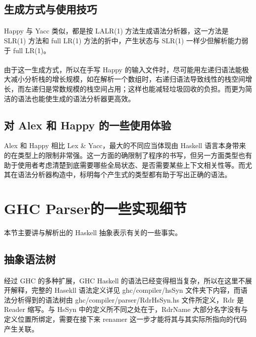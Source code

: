 \documentclass{article}
\begin{document}
 	\subsection{生成方式与使用技巧}
 	\paragraph{}
 	Happy 与 Yacc 类似，都是按 LALR(1) 方法生成语法分析器，这一方法是 SLR(1) 方法和 full LR(1) 方法的折中，产生状态与 SLR(1) 一样少但解析能力弱于 full LR(1)。
 	\paragraph{}
 	由于这一生成方式，所以在手写 Happy 的输入文件时，尽可能用左递归语法能极大减小分析栈的增长规模，如在解析一个数组时，右递归语法导致线性的栈空间增长，而左递归是常数规模的栈空间占用；这样也能减轻垃圾回收的负担。而更为简洁的语法也能使生成的语法分析器更高效。
 	\subsection{对 Alex 和 Happy 的一些使用体验}
 	Alex 和 Happy 相比 Lex \& Yacc，最大的不同应当体现由 Haskell 语言本身带来的在类型上的限制非常强。这一方面的确限制了程序的书写，但另一方面类型也有助于使用者考虑清楚到底需要哪些全局状态、是否需要某些上下文相关性等。而尤其在语法分析器构造中，标明每个产生式的类型都有助于写出正确的语法。
 	\section{GHC Parser的一些实现细节}
 	\paragraph{}
 	本节主要讲与解析出的 Haskell 抽象表示有关的一些事实。
 	\subsection{抽象语法树}
 	\paragraph{}
 	经过 GHC 的多种扩展，GHC Haskell 的语法已经变得相当复杂，所以在这里不展开解释，完整的 Hasekll 语法定义详见 ghc/compiler/hsSyn 文件夹下内容，而语法分析得到的语法树由 ghc/compiler/parser/RdrHsSyn.hs 文件所定义，Rdr 是 Reader 缩写。与 HsSyn 中的定义所不同之处在于，RdrName 大部分名字没有与定义位置所绑定，需要在接下来 renamer 这一步才能将其与其实际所指向的代码产生关联。
\end{document}
